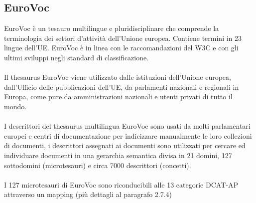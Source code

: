 \documentclass{article}
\theoremstyle{plain}
\theoremstyle{definition}
\begin{document}
\subsection{EuroVoc}
EuroVoc è un tesauro multilingue e pluridisciplinare che comprende la terminologia dei settori d'attività dell'Unione europea. Contiene termini in 23 lingue dell'UE. EuroVoc è in linea con le raccomandazioni del W3C e con gli ultimi sviluppi negli standard di classificazione. 
\\
\\
Il thesaurus EuroVoc viene utilizzato dalle istituzioni dell'Unione europea, dall'Ufficio delle pubblicazioni dell'UE, da parlamenti nazionali e regionali in Europa, come pure da amministrazioni nazionali e utenti privati di tutto il mondo.
\footnotemark
{}
\\
\\
I descrittori del thesaurus multilingua EuroVoc sono usati da molti parlamentari europei e centri di documentazione per indicizzare manualmente le loro collezioni di documenti, i descrittori assegnati ai documenti sono utilizzati per cercare ed individuare documenti in una gerarchia semantica divisa in 21 domini, 127 sottodomini (microtesauri) e circa 7000 descrittori (concetti).
\\
\\
I 127 microtesauri di EuroVoc sono riconducibili alle 13 categorie DCAT-AP attraverso un mapping (più dettagli al paragrafo 2.7.4)
\newpage
\end{document}
